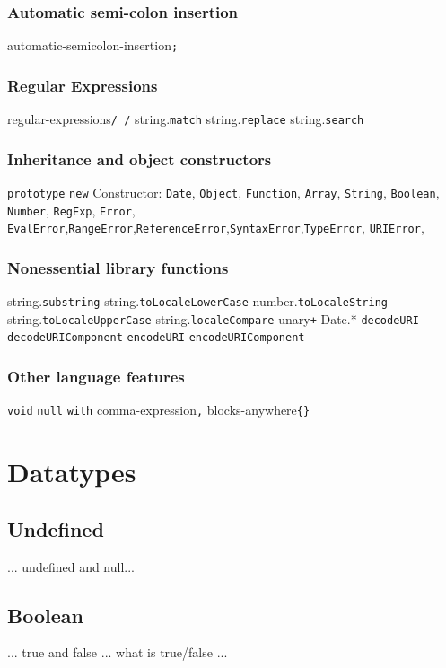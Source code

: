 \subsubsection{Automatic semi-colon insertion}
automatic-semicolon-insertion\verb|;|

\subsubsection{Regular Expressions}
regular-expressions\verb|/ /|
string.\verb|match|
string.\verb|replace|
string.\verb|search|

\subsubsection{Inheritance and object constructors}
\verb|prototype|
\verb|new|
Constructor: \verb|Date|, \verb|Object|, \verb|Function|, \verb|Array|, \verb|String|, \verb|Boolean|, \verb|Number|, \verb|RegExp|, \verb|Error|, \verb|EvalError|,\verb|RangeError|,\verb|ReferenceError|,\verb|SyntaxError|,\verb|TypeError|, \verb|URIError|,

\subsubsection{Nonessential library functions}
string.\verb|substring|
string.\verb|toLocaleLowerCase|
number.\verb|toLocaleString|
string.\verb|toLocaleUpperCase|
string.\verb|localeCompare|
unary\verb|+|
Date.*
\verb|decodeURI|
\verb|decodeURIComponent|
\verb|encodeURI|
\verb|encodeURIComponent|

\subsubsection{Other language features}
\verb|void|
\verb|null|
\verb|with|
comma-expression\verb|,|
blocks-anywhere\verb|{}|

\section{Datatypes}

\subsection{Undefined}
... undefined and null...
\subsection{Boolean}
... true and false ... what is true/false ... 
